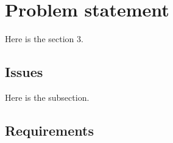 \section{Problem statement} \label{sec:problem}

Here is the section 3.

\subsection{Issues}

Here is the subsection.

\subsection{Requirements}